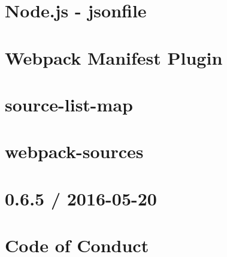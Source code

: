 \documentclass[twoside]{book}
\newcommand{\+}{\discretionary{\mbox{\scriptsize$\hookleftarrow$}}{}{}}
\begin{document}
\chapter{Node.\+js -\/ jsonfile}
\label{md__c_1_workspace_demo_src_main_script_node_modules_webpack-manifest-plugin_node_modules_jsonfile__r_e_a_d_m_e}

\chapter{Webpack Manifest Plugin}
\label{md__c_1_workspace_demo_src_main_script_node_modules_webpack-manifest-plugin__r_e_a_d_m_e}

\chapter{source-\/list-\/map}
\label{md__c_1_workspace_demo_src_main_script_node_modules_webpack-sources_node_modules_source-list-map__r_e_a_d_m_e}

\chapter{webpack-\/sources}
\label{md__c_1_workspace_demo_src_main_script_node_modules_webpack-sources__r_e_a_d_m_e}

\chapter{0.6.5 / 2016-\/05-\/20}
\label{md__c_1_workspace_demo_src_main_script_node_modules_websocket-driver__c_h_a_n_g_e_l_o_g}

\chapter{Code of Conduct}
\label{md__c_1_workspace_demo_src_main_script_node_modules_websocket-driver__c_o_d_e__o_f__c_o_n_d_u_c_t}

\end{document}
